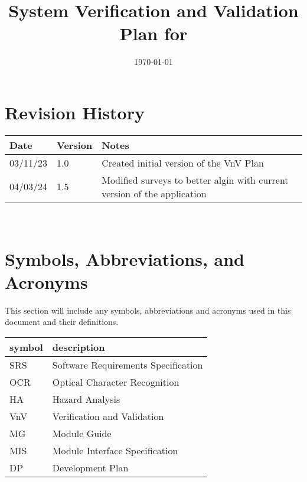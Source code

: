 \documentclass[12pt, titlepage]{article}
\begin{document}
\title{System Verification and Validation Plan for \progname{}} 
\author{\authname}
\date{\today}
	
\maketitle


\section*{Revision History}

\begin{tabularx}{\textwidth}{p{3cm}p{2cm}X}
\toprule {\bf Date} & {\bf Version} & {\bf Notes}\\
\midrule
03/11/23 & 1.0 & Created initial version of the VnV Plan\\
04/03/24 & 1.5 & Modified surveys to better algin with current version of the application\\
\bottomrule
\end{tabularx}

~\\

\newpage

\tableofcontents

\listoftables

\newpage

\section{Symbols, Abbreviations, and Acronyms}

This section will include any symbols, abbreviations and acronyms
used in this document and their definitions. \\

\renewcommand{\arraystretch}{1.2}
\begin{tabular}{l l} 
  \toprule		
  \textbf{symbol} & \textbf{description}\\
  \midrule 
  SRS & Software Requirements Specification\\
  OCR & Optical Character Recognition\\
  HA & Hazard Analysis\\
  VnV & Verification and Validation\\
  MG & Module Guide\\
  MIS & Module Interface Specification\\
  DP & Development Plan\\
  \bottomrule
\end{tabular}\\
\end{document}
